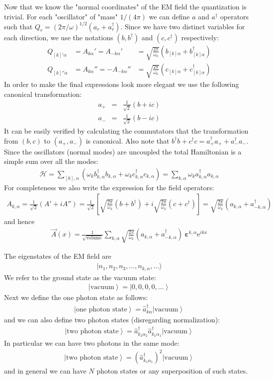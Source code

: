 \documentclass[onecolumn,fleqn, 11pt]{revtex4}
\newcommand{\eexp}{\mathrm{e}^}
\newcommand{\beq}{\begin{eqnarray}}
\newcommand{\eeq}{\end{eqnarray}}
\begin{document}
Now that we know the "normal coordinates" of 
the EM field the quantization is trivial. 
For each "oscillator" of "mass" $1/(4\pi)$ 
we can define $a$ and $a^{\dag}$ operators
such that $Q_r=(2\pi/\omega)^{1/2}(a_r+a_r^{\dag})$.  
Since we have two distinct variables for each direction, 
we use the notations $(b, b^{\dag})$ and $(c, c^{\dag})$ respectively:
\beq
Q_{[k]'\alpha}
&= A_{k\alpha}'=A_{-k\alpha}' 
&= \sqrt{\frac{2\pi}{\omega_k}} \left(b_{[k]\alpha}+b_{[k]\alpha}^{\dag}\right)
\\ 
Q_{[k]''\alpha}
&= A_{k\alpha}''=-A_{-k\alpha}'' 
&= \sqrt{\frac{2\pi}{\omega_k}} \left(c_{[k]\alpha}+c_{[k]\alpha}^{\dag}\right)
\eeq
In order to make the final expressions look more elegant 
we use the following canonical transformation: 
\beq
a_{+} &=& \frac{1}{\sqrt{2}} (b+ic) 
\\ \nonumber
a_{-} &=& \frac{1}{\sqrt{2}} (b-ic) 
\eeq
It can be easily verified by calculating the commutators 
that the transformation from $(b,c)$ to $(a_{+},a_{-})$ 
is canonical. Also note that 
$b^{\dag}b+c^{\dag}c=a_{+}^{\dag}a_{+}+a_{-}^{\dag}a_{-}$. 
Since the oscillators (normal modes) are uncoupled 
the total Hamiltonian is a simple sum over all the modes: 
\beq
\mathcal{H} = \sum_{[k],\alpha} (\omega_kb_{k,\alpha}^{\dag}b_{k,\alpha}
+ \omega_kc_{k,\alpha}^{\dag} c_{k,\alpha})
= \sum_{k,\alpha} \omega_k a_{k,\alpha}^{\dag}a_{k,\alpha}
\eeq
For completeness we also write the expression for the field operators:
\beq
A_{k,\alpha} = \frac{1}{\sqrt{2}} (A'+iA'')
= \frac{1}{\sqrt{2}}\left[ 
\sqrt{\frac{2\pi}{\omega_k}}(b+b^{\dag}) 
+ i\sqrt{\frac{2\pi}{\omega_k}}(c+c^{\dag}) \right]
= \sqrt{\frac{2\pi}{\omega_k}}(a_{k,\alpha} + a_{-k,\alpha}^{\dag})
\eeq
and hence
\beq
\vec{A}(x) 
= \frac{1}{\sqrt{\mbox{volume}}} \sum_{k,\alpha} 
\sqrt{\frac{2\pi}{\omega_k}}(a_{k,\alpha} + a_{-k,\alpha}^{\dag})
\ \bm{\varepsilon}^{k,\alpha} \eexp{ikx} 
\eeq



The eigenstates of the EM field are
\beq
|n_{1},n_{2},n_{3}, \dots ,n_{k,\alpha}, \dots \rangle 
\eeq
We refer to the ground state as the vacuum state: 
\beq
\left\vert \mbox{vacuum} \right\rangle =
\left\vert 0,0,0,0, \dots  \right\rangle  
\eeq
Next we define the one photon state as follows: 
\beq
\left\vert \mbox{one photon state} \right\rangle =
\hat{a}_{k\alpha}^{\dag}
\left\vert \mbox{vacuum} \right\rangle  
\eeq
and we can also define two photon states (disregarding normalization): 
\beq
\left\vert \mbox{two photon state} \right\rangle =
\hat{a}_{k_2\alpha_2}^{\dag}\hat{a}_{k_1\alpha_1}^{\dag} 
\left\vert  \mbox{vacuum} \right\rangle 
\eeq
In particular we can have two photons in the same mode:
\beq
\left\vert \mbox{two photon state} \right\rangle =
(\hat{a}_{k_1\alpha_1}^{\dag})^2 
\left\vert  \mbox{vacuum} \right\rangle 
\eeq
and in general we can have $N$ photon states or any 
superposition of such states. 
\end{document}
